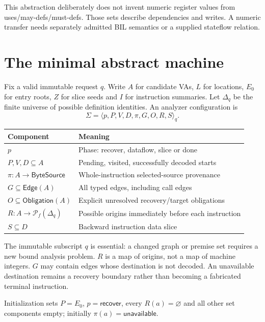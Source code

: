 \documentclass[11pt,a4paper]{article}
\newcommand{\ty}[1]{\mathsf{#1}}
\newcommand{\fin}{\mathcal{P}_{\!f}}
\begin{document}
This abstraction deliberately does not invent numeric register values from
uses/may-defs/must-defs. Those sets describe dependencies and writes. A
numeric transfer needs separately admitted BIL semantics or a supplied
stateflow relation.

\section{The minimal abstract machine}
\label{sec:machine}
Fix a valid immutable request $q$. Write $A$ for candidate VAs, $L$ for
locations, $E_0$ for entry roots, $Z$ for slice seeds and $I$ for instruction
summaries. Let $\Delta_q$ be the finite universe of possible definition
identities. An analyzer configuration is
\[
 \Sigma=\langle p,P,V,D,\pi,G,O,R,S\rangle_q.
\]
\begin{center}
\begin{tabular}{@{}ll@{}}\toprule
Component & Meaning\\\midrule
$p$ & Phase: recover, dataflow, slice or done\\
$P,V,D\subseteq A$ & Pending, visited, successfully decoded starts\\
$\pi:A\to\ty{ByteSource}$ & Whole-instruction selected-source provenance\\
$G\subseteq\ty{Edge}(A)$ & All typed edges, including call edges\\
$O\subseteq\ty{Obligation}(A)$ & Explicit unresolved recovery/target obligations\\
$R:A\to\fin(\Delta_q)$ & Possible origins immediately before each instruction\\
$S\subseteq D$ & Backward instruction data slice\\\bottomrule
\end{tabular}
\end{center}
The immutable subscript $q$ is essential: a changed graph or premise set
requires a new bound analysis problem. $R$ is a map of origins, not a map of
machine integers. $G$ may contain edges whose destination is not decoded.
An unavailable destination remains a recovery boundary rather than becoming a
fabricated terminal instruction.

Initialization sets $P=E_0$, $p=\ty{recover}$, every $R(a)=\varnothing$ and all
other set components empty; initially $\pi(a)=\ty{unavailable}$.
\end{document}

